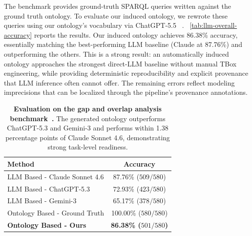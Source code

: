 \documentclass[sigconf]{acmart}
\begin{document}
The benchmark provides ground-truth SPARQL queries written against the ground truth ontology. To evaluate our induced ontology, we rewrote these queries using our ontology's vocabulary via ChatGPT-5.5 ~\cite{openai2026chatgpt55}. ~\autoref{tab:llm-overall-accuracy} reports the results. Our induced ontology achieves 86.38\% accuracy, essentially matching the best-performing LLM baseline (Claude at 87.76\%) and outperforming the others. This is a strong result: an automatically induced ontology approaches the strongest direct-LLM baseline without manual TBox engineering, while providing deterministic reproducibility and explicit provenance that LLM inference often cannot offer. The remaining errors reflect modeling imprecisions that can be localized through the pipeline’s provenance annotations.


\begin{table}[t]
\centering
\caption{\normalfont \textbf{Evaluation on the gap and overlap analysis benchmark~\cite{mridul2026benchmark}.} The generated ontology outperforms ChatGPT-5.3 and Gemini-3 and performs within 1.38 percentage points of Claude Sonnet 4.6, demonstrating strong task-level readiness.}
\vspace{-1em}
\label{tab:llm-overall-accuracy}
\begin{tabular}{lc}
\toprule
\textbf{Method} & \textbf{Accuracy} \\
\midrule
LLM Based - Claude Sonnet 4.6 & 87.76\% ($509/580$) \\
LLM Based - ChatGPT-5.3 & 72.93\% ($423/580$) \\
LLM Based - Gemini-3 & 65.17\% ($378/580$) \\
Ontology Based - Ground Truth & 100.00\% ($580/580$) \\
\midrule
\textbf{Ontology Based - Ours} & \textbf{86.38\% ($501/580$)} \\
\bottomrule
\end{tabular}
\vspace{-1em}
\end{table}
\end{document}
